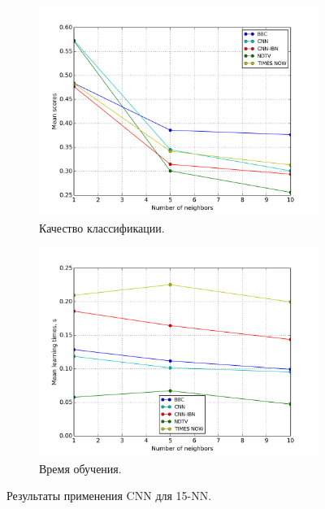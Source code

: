 \begin{figure}[h!]
    \centering
	\begin{subfigure}{0.45\textwidth}
		\includegraphics[width=\textwidth]{images/cnn-KNN.png}
		\caption{Качество классификации.}
	\end{subfigure}
	\begin{subfigure}{0.45\textwidth}
		\includegraphics[width=\textwidth]{images/cnn-KNNTime.png}
		\caption{Время обучения.}
	\end{subfigure}
	\caption{Результаты применения CNN для 15-NN.}\label{fig:cnn-knn-results}
\end{figure}

